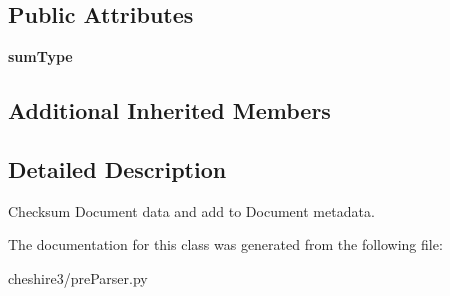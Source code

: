 \subsection*{Public Attributes}
\begin{DoxyCompactItemize}
\item 
\hypertarget{classcheshire3_1_1pre_parser_1_1_data_checksum_pre_parser_a9051abe0ab4a141926649f458ddbb6c9}{{\bfseries sum\-Type}}\label{classcheshire3_1_1pre_parser_1_1_data_checksum_pre_parser_a9051abe0ab4a141926649f458ddbb6c9}

\end{DoxyCompactItemize}
\subsection*{Additional Inherited Members}


\subsection{Detailed Description}
\begin{DoxyVerb}Checksum Document data and add to Document metadata.\end{DoxyVerb}
 

The documentation for this class was generated from the following file\-:\begin{DoxyCompactItemize}
\item 
cheshire3/pre\-Parser.\-py\end{DoxyCompactItemize}
